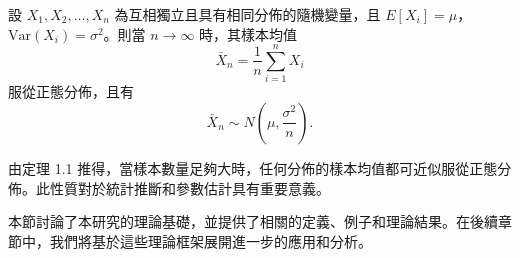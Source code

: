 \begin{theorem}
設 \( X_1, X_2, \dots, X_n \) 為互相獨立且具有相同分佈的隨機變量，且 \( E[X_i] = \mu \)，\( \text{Var}(X_i) = \sigma^2 \)。則當 \( n \to \infty \) 時，其樣本均值
\[
\bar{X}_n = \frac{1}{n} \sum_{i=1}^n X_i
\]
服從正態分佈，且有
\[
\bar{X}_n \sim N\left(\mu, \frac{\sigma^2}{n}\right).
\]
\end{theorem}

\begin{corollary}
由定理 1.1 推得，當樣本數量足夠大時，任何分佈的樣本均值都可近似服從正態分佈。此性質對於統計推斷和參數估計具有重要意義。
\end{corollary}

本節討論了本研究的理論基礎，並提供了相關的定義、例子和理論結果。在後續章節中，我們將基於這些理論框架展開進一步的應用和分析。
